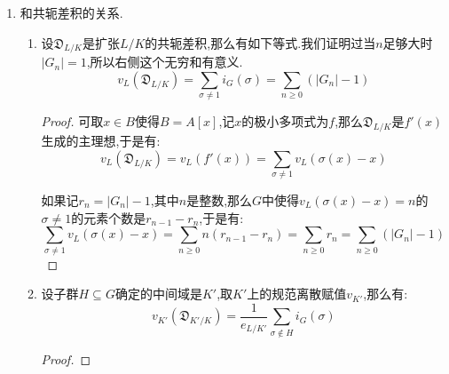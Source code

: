\begin{enumerate}
\begin{enumerate}
\begin{proof}
        	设$f(x)\in B'[x]$是$\Pi\in B$在$B'$中的极小多项式,于是$f(x)=\prod_{\tau\in H}(x-\tau(\Pi))$.记$\sigma f(x)=\prod_{\tau\in H}(x-\sigma\tau(\Pi))$.那么$\sigma f-f$的系数一定都是$\sigma f(\Pi')-\Pi'$的倍式,于是$\alpha\mid\sigma f(X)-f(X)$,于是带入$\Pi$得到$u\mid\sigma f(\Pi)-f(\Pi)=\prod_{\tau\in H}(\Pi-\sigma\tau(\Pi))=\pm v$.于是$u\mid v$.
        	
        	反过来存在$g\in A[x]$使得$\Pi'=g(\Pi)$.于是$g(x)-\Pi'=f(x)h(x)$,其中$h(x)\in B'[x]$.作用$\sigma$得到$g(x)-\sigma(\Pi')=\sigma f(x)\sigma h(x)$.带入$x=\Pi$得到$\Pi'=\sigma(\Pi')=\sigma f(\Pi)\sigma h(\Pi)=\pm v\sigma h(\Pi)$.于是$v\mid u$.综上$u$和$v$相伴,于是它们赋值相同.
        \end{proof}
        \item 如果$H=G_s$,其中$s\ge0$是整数,那么$(G/H)_t=G_t/H,t\le s$和$(G/H)_t=\{e\},t\ge s$.
        \begin{proof}
        	
        	首先$\{G_t/H,t\le s\}$构成了$G/H$的有限滤过,任取$1\not=\sigma'\in G/H$,存在唯一的指标$t<s$,使得$\sigma'\in G_t/H$但$\sigma'\not\in G_{t+1}/H$.设$\sigma\in G$是$\sigma'$的提升,那么有$\sigma\in G_t$但$\sigma\not\in G_{t+1}$.因为$H\subseteq G_0$,说明$L/K'$是完全分歧的,所以$e_{L/K'}=|H|$.带入上一条得到$i_{G/H}(\sigma')=|H|(t+1)/|H|=t+1$.于是我们证明了$i_{G/H}(\sigma')=i_G(\sigma)$,这说明$(G/H)_t$和$G_t/H$是相同的滤过,这得到结论.
        \end{proof}
    \end{enumerate}
    \item 和共轭差积的关系.
    \begin{enumerate}
    	\item 设$\mathfrak{D}_{L/K}$是扩张$L/K$的共轭差积,那么有如下等式.我们证明过当$n$足够大时$|G_n|=1$,所以右侧这个无穷和有意义.
    	$$v_L(\mathfrak{D}_{L/K})=\sum_{\sigma\not=1}i_G(\sigma)=\sum_{n\ge0}(|G_n|-1)$$
    	\begin{proof}
    		
    		可取$x\in B$使得$B=A[x]$,记$x$的极小多项式为$f$,那么$\mathfrak{D}_{L/K}$是$f'(x)$生成的主理想,于是有:
    		$$v_L(\mathfrak{D}_{L/K})=v_L(f'(x))=\sum_{\sigma\not=1}v_L(\sigma(x)-x)$$
    		
    		如果记$r_n=|G_n|-1$,其中$n$是整数,那么$G$中使得$v_L(\sigma(x)-x)=n$的$\sigma\not=1$的元素个数是$r_{n-1}-r_n$,于是有:
    		$$\sum_{\sigma\not=1}v_L(\sigma(x)-x)=\sum_{n\ge0}n(r_{n-1}-r_n)=\sum_{n\ge0}r_n=\sum_{n\ge0}(|G_n|-1)$$
    	\end{proof}
        \item 设子群$H\subseteq G$确定的中间域是$K'$,取$K'$上的规范离散赋值$v_{K'}$,那么有:
        $$v_{K'}(\mathfrak{D}_{K'/K})=\frac{1}{e_{L/K'}}\sum_{\sigma\not\in H}i_G(\sigma)$$
        \begin{proof}
        	

\end{proof}
\end{enumerate}
\end{enumerate}
